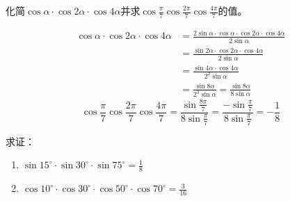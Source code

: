 \begin{example}
化简$\cos\alpha\cdot \cos2\alpha\cdot \cos4\alpha$并求$\cos\frac{\pi}{7}\cos\frac{2\pi}{7}\cos\frac{4\pi}{7}$的值。
\end{example}

\begin{solution}
\[\begin{split}
    \cos\alpha\cdot \cos2\alpha\cdot \cos4\alpha&=\frac{2\sin\alpha\cdot \cos\alpha\cdot \cos2\alpha\cdot \cos4\alpha}{2\sin\alpha}\\
    &=\frac{\sin2\alpha\cdot \cos2\alpha\cdot \cos4\alpha}{2\sin\alpha}\\
    &=\frac{\sin4\alpha\cdot \cos4\alpha}{2^2\sin\alpha}\\
    &=\frac{\sin8\alpha}{2^3\sin\alpha}=\frac{\sin 8\alpha}{8\sin \alpha}
\end{split}
\]
\[\cos\frac{\pi}{7}\cos\frac{2\pi}{7}\cos\frac{4\pi}{7}=\frac{\sin \frac{8\pi}{7}}{8\sin \frac{\pi}{7}}=\frac{-\sin\frac{\pi}{7}}{8\sin\frac{\pi}{7}}=-\frac{1}{8}\]
    
\end{solution}

\begin{example}
求证：
\begin{enumerate}
    \item $\sin15^{\circ} \cdot \sin30^{\circ} \cdot \sin75^{\circ} =\frac{1}{8}$
   \item  $\cos10^{\circ} \cdot \cos30^{\circ} \cdot \cos50^{\circ} \cdot \cos70^{\circ} =\frac{3}{16}$
\end{enumerate}    
\end{example}

